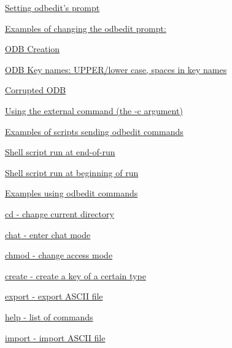 \begin{DoxyItemize}
\item \hyperlink{RC_odbedit_examples_RC_odbedit_prompt}{Setting odbedit's prompt} 
\begin{DoxyItemize}
\item \hyperlink{RC_odbedit_examples_RC_odbedit_prompt_examples}{Examples of changing the odbedit prompt:} 
\end{DoxyItemize}
\item \hyperlink{RC_odbedit_examples_RC_odbedit_create_ODB}{ODB Creation} 
\item \hyperlink{RC_odbedit_examples_RC_odbedit_keynames}{ODB Key names: UPPER/lower case, spaces in key names} 
\item \hyperlink{RC_odbedit_examples_RC_odbedit_corrupted}{Corrupted ODB} 
\item \hyperlink{RC_odbedit_examples_RC_odbedit_extcommand}{Using the external command (the -\/c argument)} 
\begin{DoxyItemize}
\item \hyperlink{RC_odbedit_examples_RC_odbedit_script_examples}{Examples of scripts sending odbedit commands} 
\begin{DoxyItemize}
\item \hyperlink{RC_odbedit_examples_RC_example_script_1}{Shell script run at end-\/of-\/run} 
\item \hyperlink{RC_odbedit_examples_RC_example_script_2}{Shell script run at beginning of run} 
\end{DoxyItemize}
\end{DoxyItemize}
\item \hyperlink{RC_odbedit_examples_RC_odbedit_cmd_examples}{Examples using odbedit commands} 
\begin{DoxyItemize}
\item \hyperlink{RC_odbedit_examples_RC_odbedit_cd}{cd -\/ change current directory} 
\item \hyperlink{RC_odbedit_examples_RC_odbedit_chat}{chat -\/ enter chat mode} 
\item \hyperlink{RC_odbedit_examples_RC_odbedit_chmod}{chmod -\/ change access mode} 
\item \hyperlink{RC_odbedit_examples_RC_odbedit_cr}{create -\/ create a key of a certain type} 
\item \hyperlink{RC_odbedit_examples_RC_odbedit_export}{export -\/ export ASCII file} 
\item \hyperlink{RC_odbedit_utility_RC_odbedit_help}{help -\/ list of commands} 
\item \hyperlink{RC_odbedit_examples_RC_odbedit_import}{import -\/ import ASCII file} 

\end{DoxyItemize}
\end{DoxyItemize}
